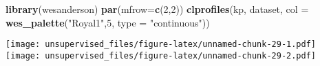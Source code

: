 \documentclass[
]{article}
\newenvironment{Shaded}{\begin{snugshade}}{\end{snugshade}}
\newcommand{\ControlFlowTok}[1]{\textcolor[rgb]{0.13,0.29,0.53}{\textbf{#1}}}
\newcommand{\DataTypeTok}[1]{\textcolor[rgb]{0.13,0.29,0.53}{#1}}
\newcommand{\DecValTok}[1]{\textcolor[rgb]{0.00,0.00,0.81}{#1}}
\newcommand{\KeywordTok}[1]{\textcolor[rgb]{0.13,0.29,0.53}{\textbf{#1}}}
\newcommand{\NormalTok}[1]{#1}
\newcommand{\OperatorTok}[1]{\textcolor[rgb]{0.81,0.36,0.00}{\textbf{#1}}}
\newcommand{\StringTok}[1]{\textcolor[rgb]{0.31,0.60,0.02}{#1}}
\begin{document}
\begin{Shaded}
\begin{Highlighting}[]
\KeywordTok{library}\NormalTok{(wesanderson)}
\KeywordTok{par}\NormalTok{(}\DataTypeTok{mfrow=}\KeywordTok{c}\NormalTok{(}\DecValTok{2}\NormalTok{,}\DecValTok{2}\NormalTok{))}
\KeywordTok{clprofiles}\NormalTok{(kp, dataset, }\DataTypeTok{col =} \KeywordTok{wes_palette}\NormalTok{(}\StringTok{"Royal1"}\NormalTok{,}\DecValTok{5}\NormalTok{, }\DataTypeTok{type =} \StringTok{"continuous"}\NormalTok{))  }
\end{Highlighting}
\end{Shaded}

\texttt{[image: unsupervised\_files/figure-latex/unnamed-chunk-29-1.pdf]}
\texttt{[image: unsupervised\_files/figure-latex/unnamed-chunk-29-2.pdf]}

\begin{Shaded}
\end{Shaded}
\end{document}
